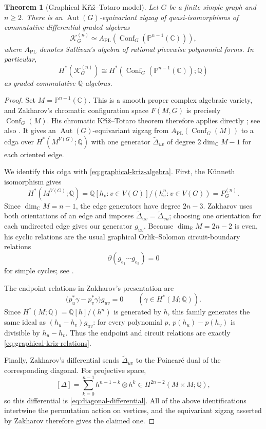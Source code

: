 \documentclass[11pt]{amsart}
\theoremstyle{plain}
\newtheorem{theorem}{Theorem}[section]
\theoremstyle{definition}
\theoremstyle{remark}
\newcommand{\Q}{\mathbb{Q}}
\newcommand{\C}{\mathbb{C}}
\newcommand{\PP}{\mathbb{P}}
\newcommand{\Conf}{\operatorname{Conf}}
\newcommand{\Aut}{\operatorname{Aut}}
\begin{document}
\begin{theorem}[Graphical K\v{r}{\'\i}\v{z}--Totaro model]
\label{thm:graphical-kriz-model}
Let $G$ be a finite simple graph and $n\geq2$.  There is an
$\Aut(G)$-equivariant zigzag of quasi-isomorphisms of commutative differential
graded algebras
\[
  \mathcal K_G^{(n)}
  \simeq A_{\mathrm{PL}}\!\left(\Conf_G(\PP^{n-1}(\C))\right),
\]
where $A_{\mathrm{PL}}$ denotes Sullivan's algebra of rational piecewise
polynomial forms.  In particular,
\[
  H^*(\mathcal K_G^{(n)})
  \cong H^*(\Conf_G(\PP^{n-1}(\C));\Q)
\]
as graded-commutative $\Q$-algebras.
\end{theorem}

\begin{proof}
Set $M=\PP^{n-1}(\C)$.  This is a smooth proper complex algebraic variety, and
Zakharov's chromatic configuration space $F(M,G)$ is precisely
$\Conf_G(M)$.  His chromatic K\v{r}{\'\i}\v{z}--Totaro theorem therefore applies
directly \cite[Theorem~6.3.1]{Zakharov}; see also \cite{ZakharovThesis}.  It
gives an $\Aut(G)$-equivariant zigzag from $A_{\mathrm{PL}}(\Conf_G(M))$ to a
cdga over $H^*(M^{V(G)};\Q)$ with one generator
$\widetilde\Delta_{uv}$ of degree $2\dim_{\C}M-1$ for each oriented edge.

We identify this cdga with \eqref{eq:graphical-kriz-algebra}.  First, the
K\"unneth isomorphism gives
\[
  H^*(M^{V(G)};\Q)
  =\Q[h_v:v\in V(G)]/(h_v^n:v\in V(G))
  =P_G^{(n)}.
\]
Since $\dim_{\C}M=n-1$, the edge generators have degree $2n-3$.  Zakharov
uses both orientations of an edge and imposes
$\widetilde\Delta_{uv}=\widetilde\Delta_{vu}$; choosing one orientation for
each undirected edge gives our generator $g_{uv}$.  Because
$\dim_{\mathbb R}M=2n-2$ is even, his cyclic relations are the usual graphical
Orlik--Solomon circuit-boundary relations
\[
  \partial(g_{e_1}\cdots g_{e_k})=0
\]
for simple cycles; see \cite[Theorem~6.2.1 and Remark~6.2.2]{Zakharov}.

The endpoint relations in Zakharov's presentation are
\[
  \bigl(p_u^*\gamma-p_v^*\gamma\bigr)g_{uv}=0
  \qquad(\gamma\in H^*(M;\Q)).
\]
Since $H^*(M;\Q)=\Q[h]/(h^n)$ is generated by $h$, this family generates the
same ideal as $(h_u-h_v)g_{uv}$: for every polynomial $p$,
$p(h_u)-p(h_v)$ is divisible by $h_u-h_v$.  Thus the endpoint and circuit
relations are exactly \eqref{eq:graphical-kriz-relations}.

Finally, Zakharov's differential sends $\widetilde\Delta_{uv}$ to the
Poincar\'e dual of the corresponding diagonal.  For projective space,
\[
  [\Delta]
  =\sum_{k=0}^{n-1}h^{n-1-k}\otimes h^k
  \in H^{2n-2}(M\times M;\Q),
\]
so this differential is \eqref{eq:diagonal-differential}.  All of the above
identifications intertwine the permutation action on vertices, and the
equivariant zigzag asserted by Zakharov therefore gives the claimed one.
\end{proof}
\end{document}
